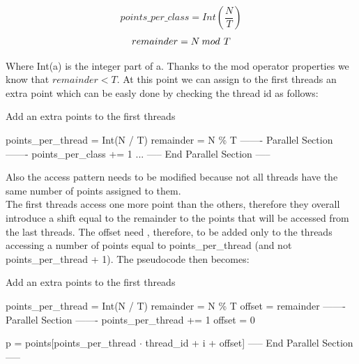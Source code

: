 \documentclass{report}
\begin{document}
\begin{minipage}[b]{0.48\textwidth}
    \begin{equation}
        points\_per\_class = Int(\frac{N}{T})
    \end{equation}
    \begin{equation}
        remainder = N\hspace{0.03in}mod\hspace{0.05in} T
    \end{equation}

    Where Int(a) is the integer part of a.
    Thanks to the mod operator properties we know that $remainder < T$. At this point we can assign to the first threads an extra point which can be easly done by checking the thread id as follows:

    \begin{algorithm}[H]
    \caption{Add an extra points to the first threads}
    \begin{algorithmic}
        \State points\_per\_thread = Int(N / T)
        \State remainder = N \% T
        \State ------- Parallel Section -------
        \State points\_per\_class += 1
        \EndIf
        \State ...
        \State ----- End Parallel Section -----
    \end{algorithmic}
    \end{algorithm}

    Also the access pattern needs to be modified because not all threads have the same number of points assigned to them. \\

    The first threads access one more point than the others, therefore they overall introduce a shift equal to the remainder to the points that will be accessed from the last threads. The offset need , therefore, to be added only to the threads accessing a number of points equal to points\_per\_thread (and not points\_per\_thread + 1). The pseudocode then becomes:

    \begin{algorithm}[H]
    \caption{Add an extra points to the first threads}
    \begin{algorithmic}
        \State points\_per\_thread = Int(N / T)
        \State remainder = N \% T
        \State offset = remainder
        \State ------- Parallel Section -------
        \State points\_per\_thread += 1
        \State offset = 0
        \EndIf

        \State p = points[points\_per\_thread $\cdot$ thread\_id + i + offset]
        \EndFor
        \State ----- End Parallel Section -----
    \end{algorithmic}
    \end{algorithm}

\end{minipage}
\end{document}
